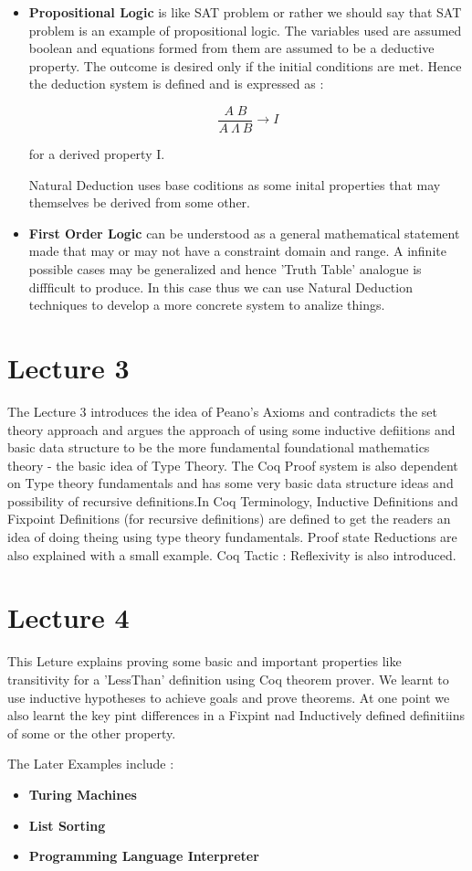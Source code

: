 \documentclass[paper=a4, fontsize=11pt]{scrartcl}
\numberwithin{equation}{section}		%
\numberwithin{figure}{section}			%
\numberwithin{table}{section}				%
\begin{document}
\begin{itemize}
	\item{ \textbf{Propositional Logic} is like SAT problem or rather we should say that SAT problem is an example of propositional logic. The variables used are assumed boolean and equations formed from them are assumed to be a deductive property. The outcome is desired only if the initial conditions are met. Hence the deduction system is defined and is expressed as :

	\[ \dfrac{A \; B}{ A \: \Lambda \: B } \rightarrow I \]

	for a derived property I.

	Natural Deduction uses base coditions as some inital properties that may themselves be derived from some other.
	}

	\item{ \textbf{First Order Logic} can be understood as a general mathematical statement made that may or may not have a constraint domain and range. A infinite possible cases may be generalized and hence 'Truth Table' analogue is diffficult to produce. In this case thus we can use Natural Deduction techniques to develop a more concrete system to analize things. 

	}
\end{itemize}

\section{Lecture 3}
The Lecture 3 introduces the idea of Peano's Axioms and contradicts the set theory approach and argues the approach of using some inductive defiitions and basic data structure to be the more fundamental foundational mathematics theory - the basic idea of Type Theory. The Coq Proof system is also dependent on Type theory fundamentals and has some very basic data structure ideas and possibility of recursive definitions.In Coq Terminology, Inductive Definitions and Fixpoint Definitions (for recursive definitions) are defined to get the readers an idea of doing theing using type theory fundamentals. Proof state Reductions are also explained with a small example. Coq Tactic  : Reflexivity is also introduced. 

\section{Lecture 4}
This Leture explains proving some basic and important properties like transitivity for a 'LessThan' definition using Coq theorem prover. We learnt to use inductive hypotheses to achieve goals and prove theorems. At one point we also learnt the key pint differences in a Fixpint nad Inductively defined definitiins of some or the other property. 

The Later Examples include :

\begin{itemize}
	\item{ \textbf{Turing Machines} 
	} 
	\item{\textbf{List Sorting}
	}
	\item{\textbf{Programming Language Interpreter}
	}
\end{itemize}
\end{document}
